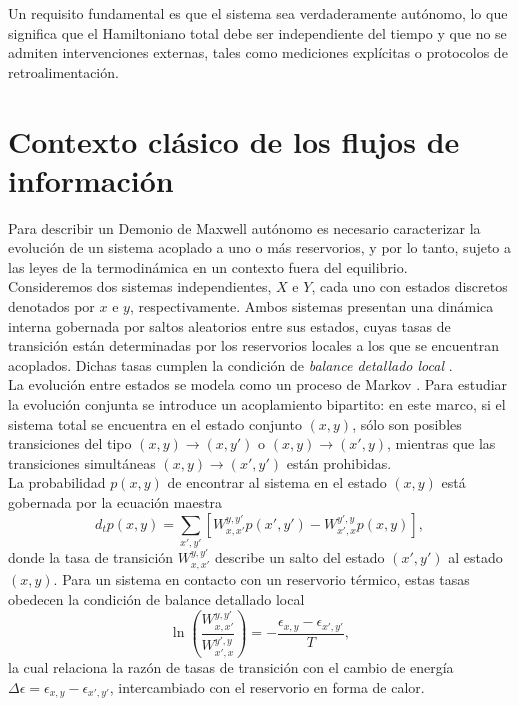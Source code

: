 Un requisito fundamental es que el sistema sea verdaderamente autónomo, lo que significa que el Hamiltoniano total debe ser independiente del tiempo y que no se admiten intervenciones externas, tales como mediciones explícitas o protocolos de retroalimentación.

\label{sec4:autonomo}
\section{Contexto clásico de los flujos de información}

Para describir un Demonio de Maxwell autónomo es necesario caracterizar la evolución de un sistema acoplado a uno o más reservorios, y por lo tanto, sujeto a las leyes de la termodinámica en un contexto fuera del equilibrio. 
\\

Consideremos dos sistemas independientes, \( X \) e \( Y \), cada uno con estados discretos denotados por \( x \) e \( y \), respectivamente. Ambos sistemas presentan una dinámica interna gobernada por saltos aleatorios entre sus estados, cuyas tasas de transición están determinadas por los reservorios locales a los que se encuentran acoplados. Dichas tasas cumplen la condición de \textit{balance detallado local} \cite{van2015ensemble}. 
\\

La evolución entre estados se modela como un proceso de Markov \cite{van1992stochastic}. Para estudiar la evolución conjunta se introduce un acoplamiento bipartito: en este marco, si el sistema total se encuentra en el estado conjunto \((x,y)\), sólo son posibles transiciones del tipo \((x,y)\to(x,y')\) o \((x,y)\to(x',y)\), mientras que las transiciones simultáneas \((x,y)\to(x',y')\) están prohibidas.
\\

La probabilidad \( p(x,y) \) de encontrar al sistema en el estado \((x,y)\) está gobernada por la ecuación maestra
\[
d_{t}p(x,y) = \sum_{x',y'} \left[ W_{x,x'}^{y,y'}p(x',y') - W_{x',x}^{y',y}p(x,y) \right],
\]
donde la tasa de transición \( W_{x,x'}^{y,y'} \) describe un salto del estado \((x',y')\) al estado \((x,y)\). Para un sistema en contacto con un reservorio térmico, estas tasas obedecen la condición de balance detallado local
\[
\ln \left( \frac{W_{x,x'}^{y,y'}}{W_{x',x}^{y',y}} \right) = -\frac{\epsilon_{x,y}-\epsilon_{x',y'}}{T},
\]
la cual relaciona la razón de tasas de transición con el cambio de energía \(\Delta \epsilon = \epsilon_{x,y}-\epsilon_{x',y'}\), intercambiado con el reservorio en forma de calor. 
\\

